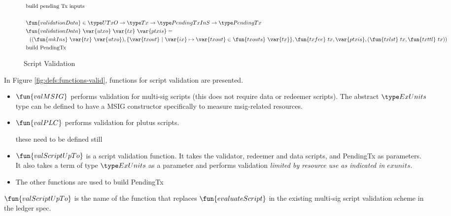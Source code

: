 \begin{figure*}[htb]
\begin{align*}
    & \text{build pending Tx inputs} \\~\\
    & \fun{validationData} \in \UTxO \to \Tx \to \PendingTxInS \to \PendingTx \\
    & \fun{validationData}~\var{utxo}~\var{tx}~\var{ptxis} = \\ &
    ~~ ((\fun{mkIns}~\var{tx}~\var{utxo}),\{ \var{txout}~\vert~ \var{ix} \mapsto \var{txout} \in \fun{txouts}~\var{tx}\},
    \fun{txfee}~{tx},\var{ptxis},(\fun{txlst}~{tx},\fun{txttl}~{tx})) \\
    & \text{build PendingTx} \\
  \end{align*}
  \caption{Script Validation}
  \label{fig:defs:functions-helper}
\end{figure*}


In Figure \ref{fig:defs:functions-valid}, functions for script validation
are presented.

\begin{itemize}
  \item $\fun{valMSIG}$ performs validation for multi-sig scripts
  (this does not require data or redeemer scripts). The abstract $\ExUnits$
  type can be defined to have a MSIG constructor specifically to
  measure msig-related resources.
  \item $\fun{valPLC}$ performs validation for plutus scripts.
  \begin{note}
    these need to be defined still
  \end{note}
\item $\fun{valScriptUpTo}$ is a script validation function. It takes the
validator, redeemer and data scripts, and PendingTx as parameters. It also
takes a term of type $\ExUnits$ as a parameter and performs validation
\textit{limited by resource use as indicated in} $exunits$.
\item The other functions are used to build PendingTx
\end{itemize}

\begin{note}
  $\fun{valScriptUpTo}$  is the name of the function that replaces
  $\fun{evaluateScript}$ in the existing multi-sig script validation
  scheme in the ledger spec.
\end{note}

